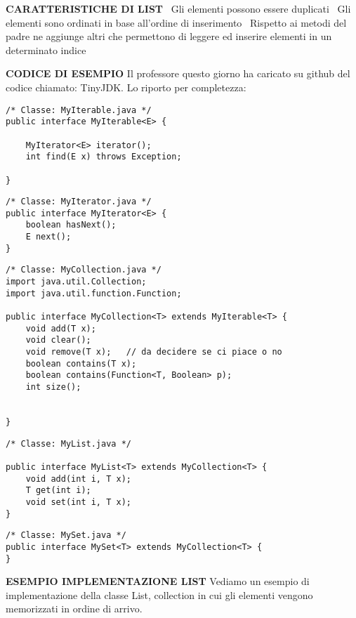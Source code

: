 \noindent \textbf{CARATTERISTICHE DI LIST}\newline
\textbullet\ Gli elementi possono essere duplicati \newline
\textbullet\ Gli elementi sono ordinati in base all'ordine di inserimento \newline	
\textbullet\ Rispetto ai metodi del padre ne aggiunge altri che permettono di leggere ed inserire elementi in un determinato indice \newline

\noindent \textbf{CODICE DI ESEMPIO}\newline
Il professore questo giorno ha caricato su github del codice chiamato: TinyJDK. Lo riporto per completezza:
\begin{lstlisting}
/* Classe: MyIterable.java */
public interface MyIterable<E> {

    MyIterator<E> iterator();
    int find(E x) throws Exception;

}
\end{lstlisting}

\begin{lstlisting}
/* Classe: MyIterator.java */
public interface MyIterator<E> {
    boolean hasNext();
    E next();
}
\end{lstlisting}

\begin{lstlisting}
/* Classe: MyCollection.java */
import java.util.Collection;
import java.util.function.Function;

public interface MyCollection<T> extends MyIterable<T> {
    void add(T x);
    void clear();
    void remove(T x);   // da decidere se ci piace o no
    boolean contains(T x);
    boolean contains(Function<T, Boolean> p);
    int size();


}
\end{lstlisting}

\begin{lstlisting}
/* Classe: MyList.java */

public interface MyList<T> extends MyCollection<T> {
    void add(int i, T x);
    T get(int i);
    void set(int i, T x);
}
\end{lstlisting}

\begin{lstlisting}
/* Classe: MySet.java */
public interface MySet<T> extends MyCollection<T> {
}
\end{lstlisting}

\noindent \textbf{ESEMPIO IMPLEMENTAZIONE LIST}\newline
Vediamo un esempio di implementazione della classe List, collection in cui gli elementi vengono memorizzati in ordine di arrivo.

